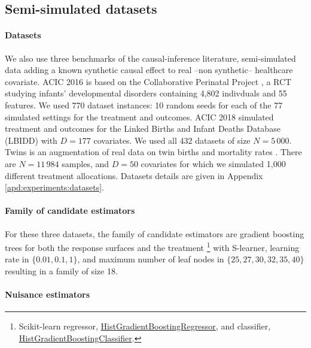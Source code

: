\documentclass[11pt]{article}
\let\cite=\supercite
\begin{document}
\subsection{Semi-simulated datasets}

\paragraph{Datasets}\label{semi_simulated:datasets}

We also use three benchmarks of the causal-inference literature, semi-simulated
data adding a known synthetic causal effect to real --non synthetic-- healthcare
covariate. ACIC 2016 \cite{dorie_automated_2019} is based on the Collaborative
Perinatal Project \cite{niswander_women_1972}, a RCT studying infants’
developmental disorders containing 4,802 indivduals and 55 features. We used 770
dataset instances: 10 random seeds for each of the 77 simulated settings for the
treatment and outcomes.  ACIC 2018 \cite{shimoni_benchmarking_2018} simulated
treatment and outcomes for the Linked Births and Infant Deaths Database (LBIDD)
\cite{macdorman_infant_1998} with $D=177$ covariates. We used all 432 datasets
of size $N=5\,000$.  Twins \cite{louizos_causal_2017} is an augmentation of real
data on twin births and mortality rates \cite{almond_costs_2005}. There are
$N=11\,984$ samples, and $D=50$ covariates for which we simulated 1,000
different treatment allocations. Datasets details are given in Appendix
\ref{apd:experiments:datasets}.


\paragraph{Family of candidate
    estimators}\label{semi_simulated:candidate_estimators}

For these three datasets, the family of candidate estimators are gradient
boosting trees for both the response surfaces and the treatment
\footnote{Scikit-learn regressor,
    \href{https://scikit-learn.org/stable/modules/generated/sklearn.ensemble.HistGradientBoostingRegressor.html}{HistGradientBoostingRegressor},
    and classifier,
    \href{https://scikit-learn.org/stable/modules/generated/sklearn.ensemble.HistGradientBoostingClassifier.html}{HistGradientBoostingClassifier}.}
with S-learner, learning rate
in $\{0.01, 0.1, 1\}$, and maximum number of leaf nodes in $\{25, 27, 30, 32,
    35, 40\}$ resulting in a family of size 18.

\paragraph{Nuisance estimators}
\end{document}
